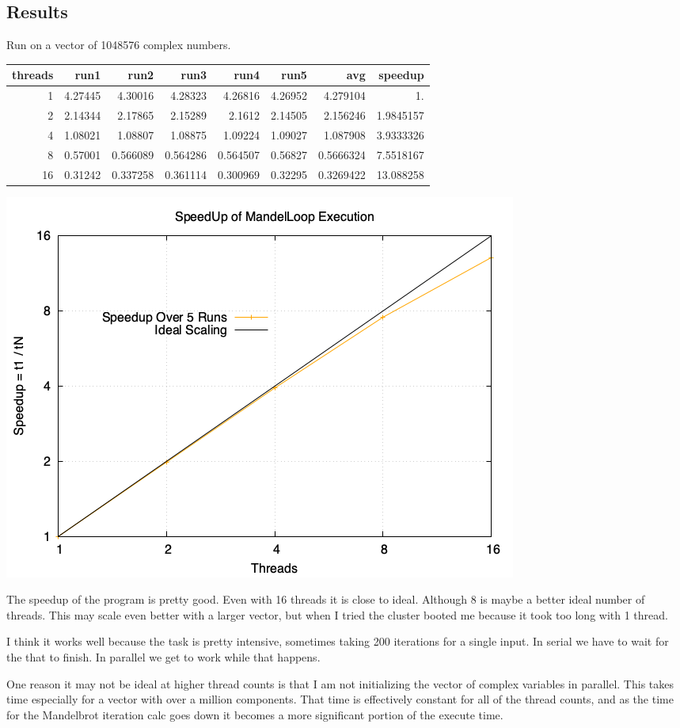 \documentclass[11pt]{article}
\begin{document}
\subsection{Results}
\label{sec:org19693de}
Run on a vector of 1048576 complex numbers.
\begin{table}[htbp]
\label{tab:orgc21d5b7}
\centering
\begin{tabular}{rrrrrrrr}
threads & run1 & run2 & run3 & run4 & run5 & avg & speedup\\[0pt]
\hline
1 & 4.27445 & 4.30016 & 4.28323 & 4.26816 & 4.26952 & 4.279104 & 1.\\[0pt]
2 & 2.14344 & 2.17865 & 2.15289 & 2.1612 & 2.14505 & 2.156246 & 1.9845157\\[0pt]
4 & 1.08021 & 1.08807 & 1.08875 & 1.09224 & 1.09027 & 1.087908 & 3.9333326\\[0pt]
8 & 0.57001 & 0.566089 & 0.564286 & 0.564507 & 0.56827 & 0.5666324 & 7.5518167\\[0pt]
16 & 0.31242 & 0.337258 & 0.361114 & 0.300969 & 0.32295 & 0.3269422 & 13.088258\\[0pt]
\end{tabular}
\end{table}
\begin{center}
\includegraphics[width=.9\linewidth]{MandelLoop_SpeedUp.png}
\end{center}


The speedup of the program is pretty good. Even with 16 threads it is
close to ideal. Although 8 is maybe a better ideal number of
threads. This may scale even better with a larger vector, but when I
tried the cluster booted me because it took too long with 1 thread.

I think it works well because the task is pretty intensive, sometimes
taking 200 iterations for a single input. In serial we have to wait
for the that to finish. In parallel we get to work while that happens.

One reason it may not be ideal at higher thread counts is that I am
not initializing the vector of complex variables in parallel. This
takes time especially for a vector with over a million
components. That time is effectively constant for all of the thread
counts, and as the time for the Mandelbrot iteration calc goes down it
becomes a more significant portion of the execute time.
\end{document}
